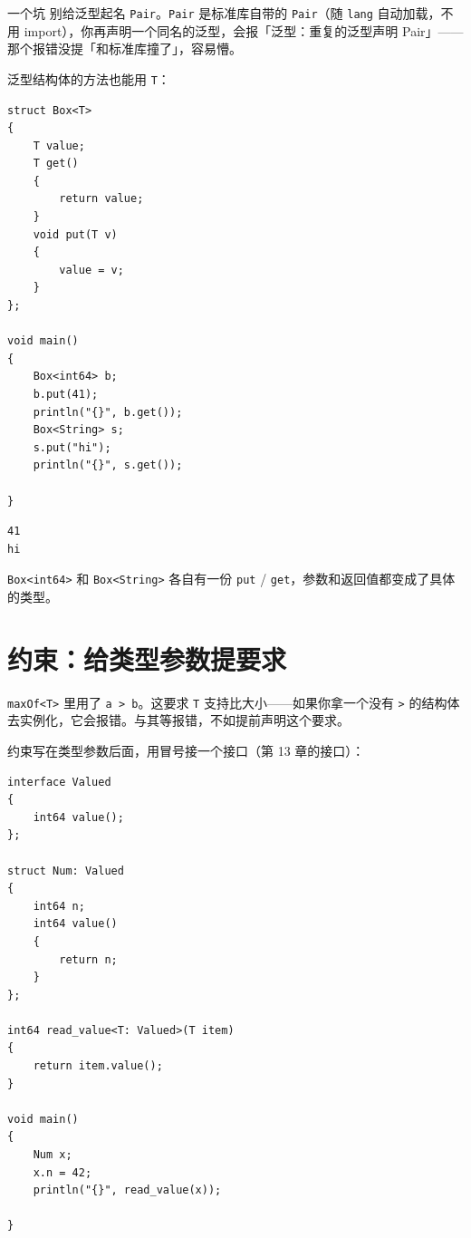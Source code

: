 \begin{tip}{一个坑}
别给泛型起名 \texttt{Pair}。\texttt{Pair} 是标准库自带的 \texttt{Pair}（随 \texttt{lang} 自动加载，不用 import），你再声明一个同名的泛型，会报「泛型：重复的泛型声明 Pair」——那个报错没提「和标准库撞了」，容易懵。
\end{tip}

泛型结构体的方法也能用 \texttt{T}：

\par
\medskip
\begin{lstlisting}[style=chali]
struct Box<T>
{
    T value;
    T get()
    {
        return value;
    }
    void put(T v)
    {
        value = v;
    }
};

void main()
{
    Box<int64> b;
    b.put(41);
    println("{}", b.get());
    Box<String> s;
    s.put("hi");
    println("{}", s.get());

}
\end{lstlisting}
\par
\medskip

\par
\medskip
\begin{lstlisting}[style=out]
41
hi
\end{lstlisting}
\par
\medskip

\texttt{Box<\allowbreak{}int64>\allowbreak{}} 和 \texttt{Box<\allowbreak{}String>\allowbreak{}} 各自有一份 \texttt{put} / \texttt{get}，参数和返回值都变成了具体的类型。

\section{约束：给类型参数提要求}

\texttt{max\allowbreak{}Of<\allowbreak{}T>\allowbreak{}} 里用了 \texttt{a >\allowbreak{} b}。这要求 \texttt{T} 支持比大小——如果你拿一个没有 \texttt{>\allowbreak{}} 的结构体去实例化，它会报错。与其等报错，不如提前声明这个要求。

约束写在类型参数后面，用冒号接一个接口（第 13 章的接口）：

\par
\medskip
\begin{lstlisting}[style=chali]
interface Valued
{
    int64 value();
};

struct Num: Valued
{
    int64 n;
    int64 value()
    {
        return n;
    }
};

int64 read_value<T: Valued>(T item)
{
    return item.value();
}

void main()
{
    Num x;
    x.n = 42;
    println("{}", read_value(x));

}
\end{lstlisting}
\par
\medskip

